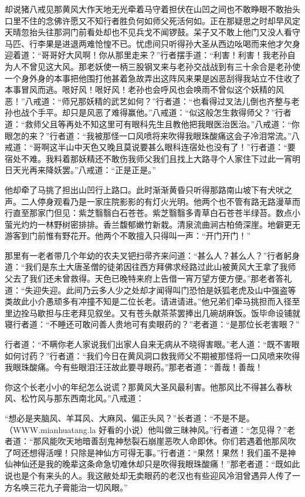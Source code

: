 \documentclass[12pt,UTF8]{ctexbook}
\begin{document}
{却说猪八戒见那黄风大作天地无光牵着马守着担伏在山凹之间也不敢睁眼不敢抬头口里不住的念佛许愿又不知行者胜负何如师父死活何如。正在那疑思之时却早风定天晴忽抬头往那洞门前看处却也不见兵戈不闻锣鼓。呆子又不敢上他门又没人看守马匹、行李果是进退两难怆惶不已。忧虑间只听得孙大圣从西边吆喝而来他才欠身迎着道：“哥哥好大风啊！你从那里走来？”行者摆手道：“利害！利害！我老孙自为人不曾见这大风。那老妖使一柄三股钢叉来与老孙交战战到有三十余合是老孙使一个身外身的本事把他围打他甚着急故弄出这阵风来果是凶恶刮得我站立不住收了本事冒风而逃。哏好风！哏好风！老孙也会呼风也会唤雨不曾似这个妖精的风恶！”八戒道：“师兄那妖精的武艺如何？”行者道：“也看得过叉法儿倒也齐整与老孙也战个手平。却只是风恶了难得赢他。”八戒道：“似这般怎生救得师父？”行者道：“救师父且等再处不知这里可有眼科先生且教他把我眼医治医治。”八戒道：“你眼怎的来？”行者道：“我被那怪一口风喷将来吹得我眼珠酸痛这会子冷泪常流。”八戒道：“哥啊这半山中天色又晚且莫说要甚么眼科连宿处也没有了！”行者道：“要宿处不难。我料着那妖精还不敢伤我师父我们且找上大路寻个人家住下过此一宵明日天光再来降妖罢。”八戒道：“正是正是。”

他却牵了马挑了担出山凹行上路口。此时渐渐黄昏只听得那路南山坡下有犬吠之声。二人停身观看乃是一家庄院影影的有灯火光明。他两个也不管有路无路漫草而行直至那家门但见：紫芝翳翳白石苍苍。紫芝翳翳多青草白石苍苍半绿苔。数点小萤光灼灼一林野树密排排。香兰馥郁嫩竹新栽。清泉流曲涧古柏倚深崖。地僻更无游客到门前惟有野花开。他两个不敢擅入只得叫一声：“开门开门！”

那里有一老者带几个年幼的农夫叉钯扫帚齐来问道：“甚么人？甚么人？”行者躬身道：“我们是东土大唐圣僧的徒弟因往西方拜佛求经路过此山被黄风大王拿了我师父去了我们还未曾救得。天色已晚特来府上告借一宵万望方便方便。”那老者答礼道：“失迎失迎。此间乃云多人少之处却才闻得叫门恐怕是妖狐老虎及山中强盗等类故此小介愚顽多有冲撞不知是二位长老。请进请进。”他兄弟们牵马挑担而入径至里边拴马歇担与庄老拜见叙坐。又有苍头献茶茶罢捧出几碗胡麻饭。饭毕命设铺就寝行者道：“不睡还可敢问善人贵地可有卖眼药的？”老者道：“是那位长老害眼？”

行者道：“不瞒你老人家说我们出家人自来无病从不晓得害眼。”老人道：“既不害眼如何讨药？”行者道：“我们今日在黄风洞口救我师父不期被那怪将一口风喷来吹得我眼珠酸痛。今有些眼泪汪汪故此要寻眼药。”那老者道：“善哉！善哉！

你这个长老小小的年纪怎么说谎？那黄风大圣风最利害。他那风比不得甚么春秋风、松竹风与那东西南北风。”八戒道：

“想必是夹脑风、羊耳风、大麻风、偏正头风？”长者道：“不是不是。（WWW.mianhuatang.la 好看的小说）他叫做三昧神风。”行者道：“怎见得？”老者道：“那风能吹天地暗善刮鬼神愁裂石崩崖恶吹人命即休。你们若遇着他那风吹了呵还想得活哩！只除是神仙方可得无事。”行者道：“果然！果然！我们虽不是神仙神仙还是我的晚辈这条命急切难休却只是吹得我眼珠酸痛！”那老者道：“既如此说也是个有来头的人。我这敝处却无卖眼药的老汉也有些迎风冷泪曾遇异人传了一方名唤三花九子膏能治一切风眼。”

}
\end{document}
